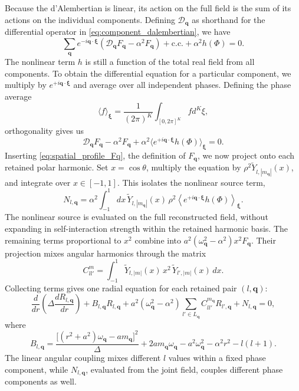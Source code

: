 \documentclass[11pt]{article}
\begin{document}
Because the d’Alembertian is linear, its action on the full field is the sum of its actions on the individual components. Defining $\mathcal{D}_\mathbf{q}$ as shorthand for the differential operator in \eqref{eq:component_dalembertian}, we have
\begin{equation}
    \sum_\mathbf{q} e^{-i\mathbf{q}\cdot\boldsymbol{\xi}} (\mathcal{D}_\mathbf{q}F_\mathbf{q} - \alpha^2 F_\mathbf{q}) + \mathrm{c.c.} + \alpha^2 h(\Phi) = 0.
\end{equation}
The nonlinear term $h$ is still a function of the total real field from all components. To obtain the differential equation for a particular component, we multiply by $e^{+i\mathbf{q}\cdot\boldsymbol{\xi}}$ and average over all independent phases. Defining the phase average
\begin{equation}
    \langle f \rangle_{\boldsymbol{\xi}} = \frac{1}{(2\pi)^K} \int_{[0,2\pi]^K} f d^K \xi,
\end{equation}
orthogonality gives us
\begin{equation}
    \mathcal{D}_\mathbf{q} F_\mathbf{q} - \alpha^2 F_\mathbf{q} + \alpha^2 \langle e^{+i\mathbf{q}\cdot\boldsymbol{\xi}} h(\Phi)\rangle_{\boldsymbol\xi} = 0. 
\end{equation}
Inserting \eqref{eq:spatial_profile_Fq}, the definition of $F_\mathbf{q}$, we now project onto each retained polar harmonic. Set \(x=\cos\theta\), multiply the equation by \(\rho^2\tilde{Y}_{l,|m_{\mathbf q}|}(x)\), and integrate over \(x\in[-1,1]\). This isolates the nonlinear source term,
\begin{equation}
    N_{l,\mathbf q} = \alpha^2\int_{-1}^{1}dx\, \tilde{Y}_{l,|m_{\mathbf q}|}(x)\,\rho^2 \left\langle e^{+i\mathbf q\cdot\boldsymbol\xi}h(\Phi) \right\rangle_{\boldsymbol\xi}.
\end{equation}
The nonlinear source is evaluated on the full reconstructed field, without expanding in self-interaction strength within the retained harmonic basis. The remaining terms proportional to \(x^2\) combine into \(a^2(\omega_{\mathbf q}^2-\alpha^2)x^2F_{\mathbf q}\). Their projection mixes angular harmonics through the matrix
\begin{equation}
    C^m_{ll'} =\int_{-1}^{1} \tilde{Y}_{l,|m|}(x)\,x^2\,\tilde{Y}_{l',|m|}(x)\,dx.
\end{equation}
Collecting terms gives one radial equation for each retained pair \((l,\mathbf q)\):
\begin{equation}
    \label{eq:radial}
    \frac{d}{dr}\left(\Delta\frac{dR_{l,\mathbf q}}{dr}\right) +B_{l,\mathbf q}R_{l,\mathbf q} +a^2(\omega_{\mathbf q}^2-\alpha^2) \sum_{l'\in L_{\mathbf q}} C^{m_{\mathbf q}}_{ll'}R_{l',\mathbf q} +N_{l,\mathbf q}=0,
\end{equation}
where
\begin{equation}
    B_{l,\mathbf q} = \frac{\big[(r^2+a^2)\omega_{\mathbf q}-am_{\mathbf q}\big]^2}{\Delta} +2am_{\mathbf q}\omega_{\mathbf q} -a^2\omega_{\mathbf q}^2 -\alpha^2r^2-l(l+1).
\end{equation}
The linear angular coupling mixes different \(l\) values within a fixed phase component, while \(N_{l,\mathbf q}\), evaluated from the joint field, couples different phase components as well.
\end{document}
